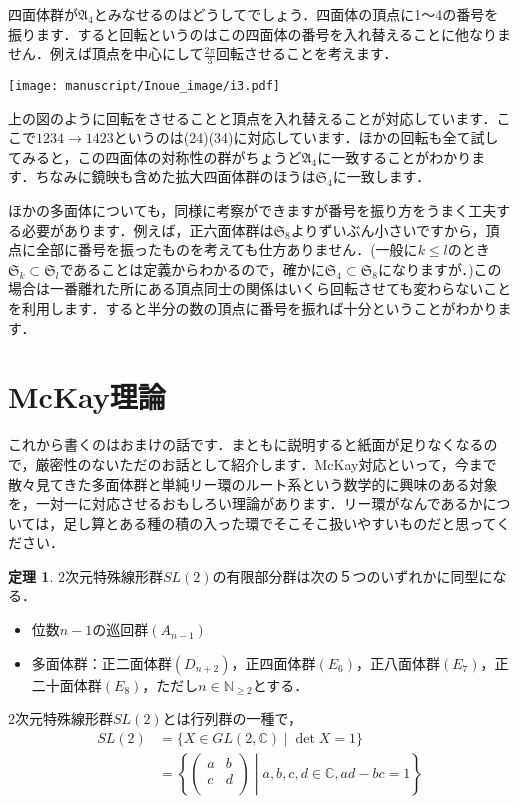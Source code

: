 \documentclass[/main]{subfiles} %
\theoremstyle{definition} %
\newtheorem{ithm}[idefi]{定理}
\begin{document}
四面体群が$\mathfrak{A}_4$とみなせるのはどうしてでしょう．四面体の頂点に1～4の番号を振ります．すると回転というのはこの四面体の番号を入れ替えることに他なりません．例えば頂点を中心にして$\frac{2\pi}{3}$回転させることを考えます．

\texttt{[image: manuscript/Inoue\_image/i3.pdf]}

上の図のように回転をさせることと頂点を入れ替えることが対応しています．ここで$1234\rightarrow1423$というのは(24)(34)に対応しています．ほかの回転も全て試してみると，この四面体の対称性の群がちょうど$\mathfrak{A}_4$に一致することがわかります．ちなみに鏡映も含めた拡大四面体群のほうは$\mathfrak{S}_4$に一致します．

ほかの多面体についても，同様に考察ができますが番号を振り方をうまく工夫する必要があります．例えば，正六面体群は$\mathfrak{S}_8$よりずいぶん小さいですから，頂点に全部に番号を振ったものを考えても仕方ありません．(一般に$k\leq l$のとき$\mathfrak{S}_k \subset \mathfrak{S}_l$であることは定義からわかるので，確かに$\mathfrak{S}_4 \subset \mathfrak{S}_8$になりますが．)この場合は一番離れた所にある頂点同士の関係はいくら回転させても変わらないことを利用します．すると半分の数の頂点に番号を振れば十分ということがわかります．

\section{McKay理論}%
これから書くのはおまけの話です．まともに説明すると紙面が足りなくなるので，厳密性のないただのお話として紹介します．McKay対応といって，今まで散々見てきた多面体群と単純リー環のルート系という数学的に興味のある対象を，一対一に対応させるおもしろい理論があります．リー環がなんであるかについては，足し算とある種の積の入った環でそこそこ扱いやすいものだと思ってください．

\begin{ithm}
  $2$次元特殊線形群$SL(2)$の有限部分群は次の５つのいずれかに同型になる．
  \begin{itemize}
  \item 位数$n-1$の巡回群$(A_{n-1})$ %
  \item 多面体群：正二面体群$(D_{n+2})$，正四面体群$(E_6)$，正八面体群$(E_7)$，正二十面体群$(E_8)$，ただし$n \in\mathbb{N}_{ \geq 2}$とする．
  \end{itemize}
\end{ithm}
$2$次元特殊線形群$SL(2)$とは行列群の一種で，
\begin{align*}
  SL(2)&=\{X\in GL(2,\mathbb{C}) \mid \det X=1\}\\
       &=\left\{
           \begin{pmatrix} 
             a&b\\ 
             c&d\\ 
           \end{pmatrix}
  \middle| a,b,c,d \in \mathbb{C} ,ad-bc=1\right\} %
\end{align*} %
\end{document}
